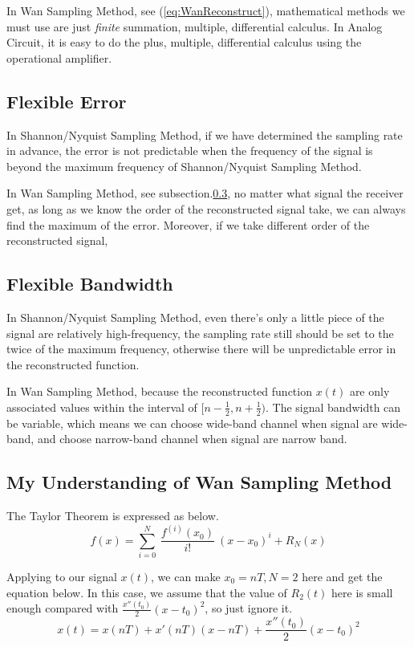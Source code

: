 \documentclass{article}
\begin{document}
In Wan Sampling Method, see (\ref{eq:WanReconstruct}), mathematical methods we must use are just \emph{finite} summation, multiple, differential calculus. In Analog Circuit, it is easy to do the plus, multiple, differential calculus using the operational amplifier.

\subsection{Flexible Error}
In Shannon/Nyquist Sampling Method, if we have determined the sampling rate in advance, the error is not predictable when the frequency of the signal is beyond the maximum frequency of Shannon/Nyquist Sampling Method.

In Wan Sampling Method, see subsection.\ref{wanSampling}, no matter what signal the receiver get, as long as we know the order of the reconstructed signal take, we can always find the maximum of the error. Moreover, if we take different order of the reconstructed signal,


\subsection{Flexible Bandwidth}
In Shannon/Nyquist Sampling Method, even there's only a little piece of the signal are relatively high-frequency, the sampling rate still should be set to the twice of the maximum frequency, otherwise there will be unpredictable error in the reconstructed function.

In Wan Sampling Method, because the reconstructed function $x(t)$ are only associated values within the interval of $[n - \frac12, n + \frac12)$. The signal bandwidth can be variable, which means we can choose wide-band channel when signal are wide-band, and choose narrow-band channel when signal are narrow band.

\subsection{My Understanding of Wan Sampling Method}
\label{wanSampling}

The Taylor Theorem is expressed as below.
$$
f(x) = \sum_{i = 0}^{N} ~ \frac{f^{(i)}(x_0)}{i!} ~ (x - x_0)^i + R_N(x)
$$

Applying to our signal $x(t)$, we can make $x_0 = nT, N = 2$ here and get the equation below. In this case, we assume that the value of $R_2(t)$ here is small enough compared with $\frac{x''(t_0)}{2}(x - t_0)^2$, so just ignore it.
\begin{equation}
	x(t) = x(nT) + x'(nT)(x - nT) + \frac{x''(t_0)}{2}(x - t_0)^2
\end{equation}
\end{document}
